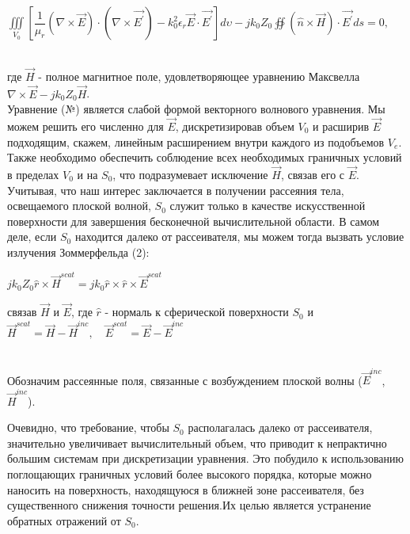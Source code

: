 \begin{center}
	$ 	\iiint\limits_{V_{0}}^{} \left[ \dfrac{1}{\mu_{r}}(\nabla \times \vec{E}) \cdot (\nabla \times \vec{E^{'}}) - k_{0}^{2} \epsilon_{r}\vec{E} \cdot \vec{E^{'}} \right]d\upsilon - jk_{0}Z_{0} \oiint (\hat{n} \times \vec{H}) \cdot \vec{E^{'}}ds = 0,$
\end{center}\\
где $ \vec{H} $ - полное магнитное поле, удовлетворяющее уравнению Максвелла $ \nabla \times \vec{E} - jk_{0}Z_{0}\vec{H}  $.\\
Уравнение (№) является слабой формой векторного волнового уравнения. Мы можем решить его численно для $ \vec{E} $, дискретизировав объем $ V_{0} $ и расширив $ \vec{E} $ подходящим, скажем, линейным расширением внутри каждого из подобъемов $V_{e}$. \\
Также необходимо обеспечить соблюдение всех необходимых граничных условий в пределах $V_{0}$ и на $S_{0}$, что подразумевает исключение $\vec{H}$, связав его с $\vec{E}$. \\
Учитывая, что наш интерес заключается в получении рассеяния тела, освещаемого плоской волной, $S_{0}$ служит только в качестве искусственной поверхности для завершения бесконечной вычислительной области. В самом деле, если $S_{0}$ находится далеко от рассеивателя, мы можем тогда вызвать условие излучения Зоммерфельда (2): \\
\begin{center}
	$ jk_{0}Z_{0}\hat{r} \times \vec{H}^{scat} = jk_{0}\hat{r} \times \hat{r} \times \vec{E}^{scat} $ \\
	\begin{center}
связав $ \vec{H} $ и $ \vec{E} $, где $ \hat{r} $ - нормаль к сферической поверхности $ S_{0} $ и \\
		$ \vec{H}^{scat} = \vec{H} - \vec{H}^{inc},\quad \vec{E}^{scat} = \vec{E} - \vec{E}^{inc}$
	\end{center}\\
Обозначим рассеянные поля, связанные с возбуждением плоской волны ($ \vec{E}^{inc} $, $ \vec{H}^{inc} $).
\end{center}
Очевидно, что требование, чтобы $ S_{0} $ располагалась далеко от рассеивателя, значительно увеличивает вычислительный объем, что приводит к непрактично большим системам при дискретизации уравнения. Это побудило к использованию поглощающих граничных условий более высокого порядка, которые можно наносить на поверхность, находящуюся в ближней зоне рассеивателя, без существенного снижения точности решения.Их целью является устранение обратных отражений от $ S_{0} $. \\
